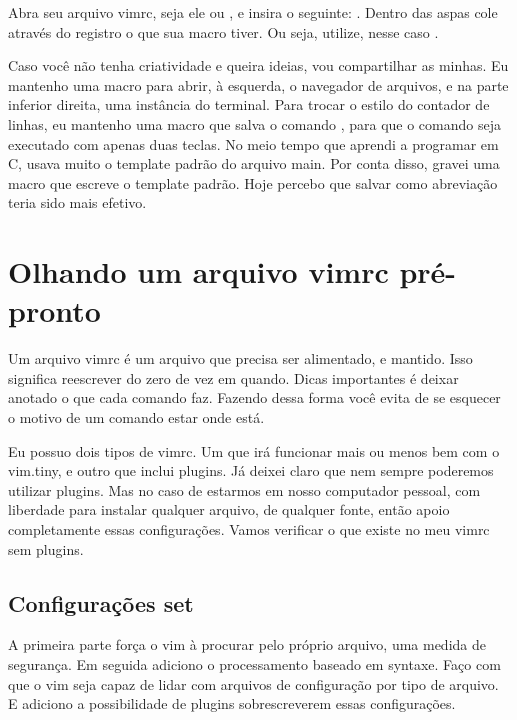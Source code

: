 Abra seu arquivo vimrc, seja ele  ou , e insira o seguinte:
.
Dentro das aspas cole através do registro o que sua macro tiver.
Ou seja, utilize, nesse caso .

Caso você não tenha criatividade e queira ideias, vou compartilhar as minhas.
Eu mantenho uma macro para abrir, à esquerda,
o navegador de arquivos, e na parte inferior direita, uma instância do terminal.
Para trocar o estilo do contador de linhas, eu mantenho uma macro que salva o comando
, para que o comando seja executado com apenas duas teclas.
No meio tempo que aprendi a programar em C, usava muito o template padrão do arquivo main.
Por conta disso, gravei uma macro que escreve o template padrão.
Hoje percebo que salvar como abreviação teria sido mais efetivo.


\section{Olhando um arquivo vimrc pré-pronto}
Um arquivo vimrc é um arquivo que precisa ser alimentado, e mantido.
Isso significa reescrever do zero de vez em quando.
Dicas importantes é deixar anotado o que cada comando faz.
Fazendo dessa forma você evita de se esquecer o motivo de um comando estar onde está.

Eu possuo dois tipos de vimrc.
Um que irá funcionar mais ou menos bem com o vim.tiny, e outro que inclui plugins.
Já deixei claro que nem sempre poderemos utilizar plugins.
Mas no caso de estarmos em nosso computador pessoal, com liberdade para instalar qualquer arquivo,
de qualquer fonte, então apoio completamente essas configurações.
Vamos verificar o que existe no meu vimrc sem plugins.


\subsection{Configurações set}

A primeira parte força o vim à procurar pelo próprio arquivo,
uma medida de segurança.
Em seguida adiciono o processamento baseado em syntaxe.
Faço com que o vim seja capaz de lidar com arquivos de configuração por tipo de arquivo.
E adiciono a possibilidade de plugins sobrescreverem essas configurações.

